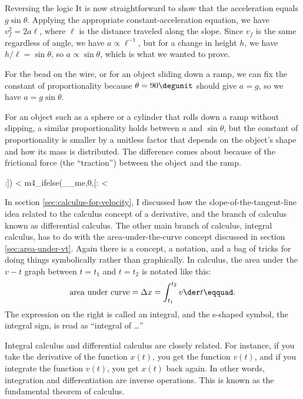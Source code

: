 \begin{eg}{Reversing the logic}
It is now straightforward to show that the acceleration equals $g\sin\theta$.
Applying the appropriate constant-acceleration equation, we have $v_f^2=2a\ell$, where
$\ell$ is the distance traveled along the slope.
Since $v_f$ is the same regardless of angle,
we have $a\propto\ell^{-1}$, but for a change in height $h$, we have $h/\ell=\sin\theta$,
so $a\propto\sin\theta$, which is what we wanted to prove.

For the bead on the wire, or for an object sliding down a ramp,
we can fix the constant of proportionality because $\theta=90\degunit$ should give $a=g$,
so we have $a=g\sin\theta$.

For an object such as a sphere or a cylinder that rolls down a ramp without slipping, a similar proportionality holds between
$a$ and $\sin\theta$, but the constant of proportionality is smaller by a unitless factor that depends on the
object's shape and how its mass is distributed.
The difference comes about because of the frictional force (the ``traction'') between
the object and the ramp.
\end{eg}
:])
<%
m4_ifelse(__me,0,[:
<%

In section \ref{sec:calculus-for-velocity}, I discussed how the slope-of-the-tangent-line
idea related to the calculus concept of a derivative, and
the branch of calculus known as differential calculus. The
other main branch of calculus, integral
calculus, has to do with the area-under-the-curve concept
discussed in section \ref{sec:area-under-vt}. Again there is a
concept, a notation, and a bag of tricks for doing things
symbolically rather than graphically. In calculus, the area
under the $v-t$ graph between $t=t_1$ and $t=t_2$ is notated like this:
\begin{equation*}
  \text{area under curve} = \Delta x = \int_{t_1}^{t_2}v \der t\eqquad.
\end{equation*}
The expression on the right is called an integral, and the
s-shaped symbol, the integral sign, is read as ``integral of \ldots''

Integral calculus and differential calculus are closely
related. For instance, if you take the derivative of the
function $x(t)$, you get the function $v(t)$, and if you
integrate the function $v(t)$, you get $x(t)$ back again. In
other words, integration and differentiation are inverse
operations. This is known as the fundamental theorem of
calculus.

